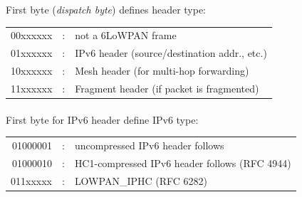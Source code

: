 First byte (\textit{dispatch byte}) defines header type:
\begin{tabular}{rcl}
    00xxxxxx&:& not a 6LoWPAN frame\\
    01xxxxxx&:& IPv6 header (source/destination addr., etc.)\\
    10xxxxxx&:& Mesh header (for multi-hop forwarding)\\
    11xxxxxx&:& Fragment header (if packet is fragmented)\\
\end{tabular}

\paragraph{}

First byte for IPv6 header define IPv6 type: 
\begin{tabular}{rcl}
    01000001&:& uncompressed IPv6 header follows\\
    01000010&:& HC1-compressed IPv6 header follows (RFC 4944)\\
    011xxxxx&:& LOWPAN\_IPHC (RFC 6282)\\
\end{tabular}


